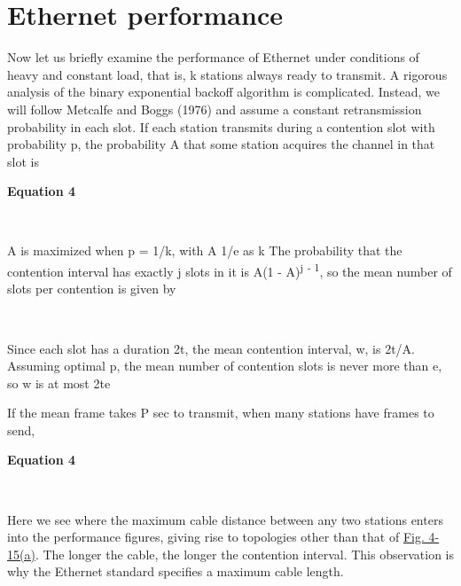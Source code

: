 \protect\hypertarget{0130661023_ch04lev1sec3.htmlux5cux23ch04lev2sec13}{}{}

\section{Ethernet performance}

Now let us briefly examine the performance of Ethernet under conditions
of heavy and constant load, that is, {k} stations always ready to
transmit. A rigorous analysis of the binary exponential backoff
algorithm is complicated. Instead, we will follow Metcalfe and Boggs
(1976) and assume a constant retransmission probability in each slot. If
each station transmits during a contention slot with probability {p},
the probability {A} that some station acquires the channel in that slot
is

\textbf{\protect\hypertarget{0130661023_ch04lev1sec3.htmlux5cux23ch04eq05}{}{}
Equation 4}


~

{A} is maximized when {p} = 1{/k}, with {A}
1{/e} as {k}
The probability that the contention interval has exactly {j} slots in it
is {A}(1 - {A}){\textsuperscript{j}} \textsuperscript{- 1}, so the mean
number of slots per contention is given by


~

Since each slot has a duration 2{t}, the mean contention interval, {w},
is 2{t}{/A.} Assuming optimal {p}, the mean number of contention slots
is never more than {e}, so {w} is at most 2{t}{e}

If the mean frame takes {P} sec to transmit, when many stations have
frames to send,

\textbf{\protect\hypertarget{0130661023_ch04lev1sec3.htmlux5cux23ch04eq06}{}{}
Equation 4}


~

Here we see where the maximum cable distance between any two stations
enters into the performance figures, giving rise to topologies other
than that of
\protect\hyperlink{0130661023_ch04lev1sec3.htmlux5cux23ch04fig15}{Fig.
4-15(a)}. The longer the cable, the longer the contention interval. This
observation is why the Ethernet standard specifies a maximum cable
length.

